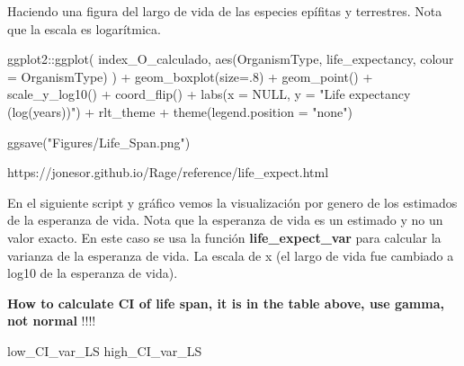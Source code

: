 \documentclass[
  12pt,
  letterpaper,
]{book}
\newenvironment{Shaded}{\begin{snugshade}}{\end{snugshade}}
\newcommand{\AttributeTok}[1]{\textcolor[rgb]{0.40,0.45,0.13}{#1}}
\newcommand{\ConstantTok}[1]{\textcolor[rgb]{0.56,0.35,0.01}{#1}}
\newcommand{\DecValTok}[1]{\textcolor[rgb]{0.68,0.00,0.00}{#1}}
\newcommand{\FunctionTok}[1]{\textcolor[rgb]{0.28,0.35,0.67}{#1}}
\newcommand{\NormalTok}[1]{\textcolor[rgb]{0.00,0.23,0.31}{#1}}
\newcommand{\SpecialCharTok}[1]{\textcolor[rgb]{0.37,0.37,0.37}{#1}}
\newcommand{\StringTok}[1]{\textcolor[rgb]{0.13,0.47,0.30}{#1}}
\begin{document}
Haciendo una figura del largo de vida de las especies epífitas y
terrestres. Nota que la escala es logarítmica.

\begin{Shaded}
\begin{Highlighting}[]
\NormalTok{ggplot2}\SpecialCharTok{::}\FunctionTok{ggplot}\NormalTok{(}
\NormalTok{  index\_O\_calculado,}
  \FunctionTok{aes}\NormalTok{(OrganismType, life\_expectancy, }\AttributeTok{colour =}\NormalTok{ OrganismType)}
\NormalTok{) }\SpecialCharTok{+}
  \FunctionTok{geom\_boxplot}\NormalTok{(}\AttributeTok{size=}\NormalTok{.}\DecValTok{8}\NormalTok{) }\SpecialCharTok{+}
  \FunctionTok{geom\_point}\NormalTok{() }\SpecialCharTok{+}
  \FunctionTok{scale\_y\_log10}\NormalTok{() }\SpecialCharTok{+}
  \FunctionTok{coord\_flip}\NormalTok{() }\SpecialCharTok{+}
  \FunctionTok{labs}\NormalTok{(}\AttributeTok{x =} \ConstantTok{NULL}\NormalTok{, }\AttributeTok{y =} \StringTok{"Life expectancy (log(years))"}\NormalTok{) }\SpecialCharTok{+}
\NormalTok{  rlt\_theme }\SpecialCharTok{+}
  \FunctionTok{theme}\NormalTok{(}\AttributeTok{legend.position =} \StringTok{"none"}\NormalTok{)}

\FunctionTok{ggsave}\NormalTok{(}\StringTok{"Figures/Life\_Span.png"}\NormalTok{)}
\end{Highlighting}
\end{Shaded}

https://jonesor.github.io/Rage/reference/life\_expect.html

En el siguiente script y gráfico vemos la visualización por genero de
los estimados de la esperanza de vida. Nota que la esperanza de vida es
un estimado y no un valor exacto. En este caso se usa la función
\textbf{life\_expect\_var} para calcular la varianza de la esperanza de
vida. La escala de x (el largo de vida fue cambiado a log10 de la
esperanza de vida).

\textbf{How to calculate CI of life span, it is in the table above, use
gamma, not normal} !!!!

low\_CI\_var\_LS high\_CI\_var\_LS
\end{document}
